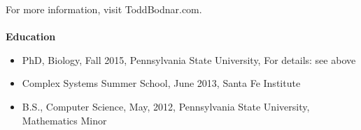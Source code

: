 For more information, visit ToddBodnar.com.
\\ \\
\textbf{Education}
\begin{itemize}
\setlength\itemsep{0em}
\item PhD, Biology, Fall 2015, Pennsylvania State University, For details: see above
\item Complex Systems Summer School, June 2013, Santa Fe Institute
\item B.S., Computer Science,  May, 2012, Pennsylvania State University, Mathematics Minor
\end{itemize}
%
%
%
\ 
\\ 
